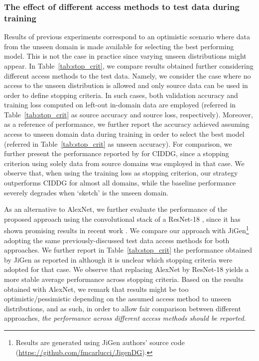 \documentclass{article}
\begin{document}
\subsubsection{The effect of different access methods to test data during training} 
Results of previous experiments correspond to an optimistic scenario where data from the unseen domain is made available for selecting the best performing model. This is not the case in practice since varying unseen distributions might appear. In Table~\ref{tab:stop_crit}, we compare results obtained further considering different access methods to the test data. Namely, we consider the case where no access to the unseen distribution is allowed and only source data can be used in order to define stopping criteria. In such cases, both validation accuracy and training loss computed on left-out in-domain data are employed (referred in Table~\ref{tab:stop_crit} as source accuracy and source loss, respectively). Moreover, as a reference of performance, we further report the accuracy achieved assuming access to unseen domain data during training in order to select the best model (referred in Table~\ref{tab:stop_crit} as unseen accuracy). For comparison, we further present the performance reported by \cite{li2018deep} for CIDDG, since a stopping criterion using solely data from source domains was employed in that case. We observe that, when using the training loss as stopping criterion, our strategy outperforms CIDDG for almost all domains, while the baseline performance severely degrades when `sketch' is the unseen domain. 

As an alternative to AlexNet, we further evaluate the performance of the proposed approach using the convolutional stack of a ResNet-18 \cite{he2016deep}, since it has shown promising results in recent work \cite{carlucci2019domain}. We compare our approach with JiGen\footnote{\label{fn:jigen}Results are generated using JiGen authors' source code (\url{https://github.com/fmcarlucci/JigenDG}).} adopting the same previously-discussed test data access methods for both approaches. We further report in Table~\ref{tab:stop_crit} the performance obtained by JiGen as reported in \cite{carlucci2019domain} although it is unclear which stopping criteria were adopted for that case. We observe that replacing AlexNet by ResNet-18 yields a more stable average performance across stopping criteria. Based on the results obtained with AlexNet, we remark that results might be too optimistic/pessimistic depending on the assumed access method to unseen distributions, and as such, in order to allow fair comparison between different approaches, \emph{the performance across different access methods should be reported}.
\end{document}
